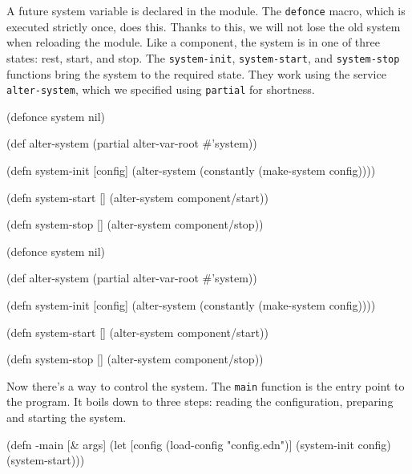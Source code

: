 A future system variable is declared in the module. The \verb|defonce| macro, which is executed strictly once, does this. Thanks to this, we will not lose the old system when reloading the module. Like a component, the system is in one of three states: rest, start, and stop. The \verb|system-init|, \verb|system-start|, and \verb|system-stop| functions bring the system to the required state. They work using the service \verb|alter-system|, which we specified using \verb|partial| for shortness.


\ifnarrow

\begin{english}
  \begin{clojure}
(defonce system nil)

(def alter-system
  (partial alter-var-root #'system))

(defn system-init [config]
  (alter-system
    (constantly (make-system config))))

(defn system-start []
  (alter-system component/start))

(defn system-stop []
  (alter-system component/stop))
  \end{clojure}
\end{english}

\else

\begin{english}
  \begin{clojure}
(defonce system nil)

(def alter-system (partial alter-var-root #'system))

(defn system-init [config]
  (alter-system (constantly (make-system config))))

(defn system-start []
  (alter-system component/start))

(defn system-stop []
  (alter-system component/stop))
  \end{clojure}
\end{english}

\fi


Now there's a way to control the system. The \verb|main| function is the entry point to the program. It boils down to three steps: reading the configuration, preparing and starting the system.

\ifnarrow

\begin{english}
  \begin{clojure}
(defn -main [& args]
  (let [config
        (load-config "config.edn")]
    (system-init config)
    (system-start)))
  \end{clojure}
\end{english}

